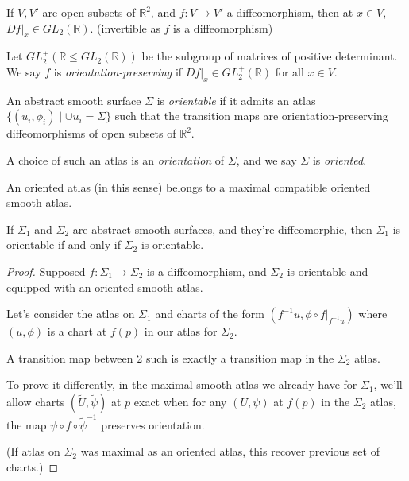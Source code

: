 If \(V, V'\) are open subsets of \(\mathbb{R}^2\), and \(f: V \to V'\) a diffeomorphism, then at \(x \in V\), \(\left.Df\right|_x \in GL_2(\mathbb{R})\). (invertible as \(f\) is a diffeomorphism)

Let \(GL^+_2(\mathbb{R}\leq GL_2(\mathbb{R}))\) be the subgroup of matrices of positive determinant. We say \(f\) is \textit{orientation-preserving} if \(\left. Df\right|_x \in GL^+_2(\mathbb{R})\) for all \(x \in V\).

\begin{definition}
    An abstract smooth surface \(\Sigma\) is \textit{orientable}  if it admits an atlas \(\{(u_i, \phi_i)\mid \cup u_i = \Sigma\}\) such that the transition maps are orientation-preserving diffeomorphisms of open subsets of \(\mathbb{R}^2\).

    A choice of such an atlas is an \textit{orientation} of \(\Sigma\), and we say \(\Sigma\) is \textit{oriented}.
\end{definition}
\begin{remark}
    An oriented atlas (in this sense) belongs to a maximal compatible oriented smooth atlas.
\end{remark}
\begin{lemma}
    If \(\Sigma_1\) and \(\Sigma_2\) are abstract smooth surfaces, and they're diffeomorphic, then \(\Sigma_1\) is orientable if and only if \(\Sigma_2\) is orientable.
\end{lemma}
\begin{proof}
    Supposed \(f: \Sigma_1 \to \Sigma_2\) is a diffeomorphism, and \(\Sigma_2\) is orientable and equipped with an oriented smooth atlas.

    Let's consider the atlas on \(\Sigma_1\) and charts of the form \((f^{-1}u, \left. \phi\circ f \right|_{f^{-1}u})\) where \((u, \phi)\) is a chart at \(f(p)\) in our atlas for \(\Sigma_2\).

    A transition map between 2 such is exactly a transition map in the \(\Sigma_2\) atlas.

    To prove it differently, in the maximal smooth atlas we already have for \(\Sigma_1\), we'll allow charts \((\tilde{U}, \tilde{\psi})\) at \(p\) exact when for any \((U, \psi)\) at \(f(p)\) in the \(\Sigma_2\) atlas, the map \(\psi\circ f \circ \tilde{\psi}^{-1}\) preserves orientation.

    (If atlas on \(\Sigma_2\) was maximal as an oriented atlas, this recover previous set of charts.)
\end{proof}
